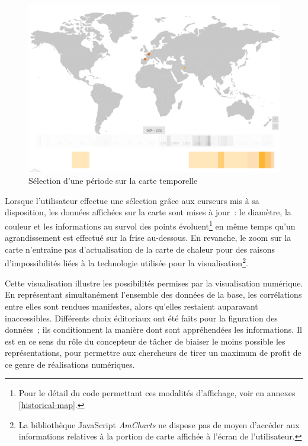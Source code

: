 \documentclass[a4paper,12pt,twoside]{book}
\newcommand{\eng}{\emph}
\begin{document}
\begin{figure}[h!]
	\centering
	\includegraphics[width=16cm]{Images/Visualisations/Historical_navigation-Time_range.png}
	\caption{Sélection d'une période sur la carte temporelle}
\end{figure}

Lorsque l'utilisateur effectue une sélection grâce aux curseurs mis à sa disposition, les données affichées sur la carte sont mises à jour~: le diamètre, la couleur et les informations au survol des points évoluent\footnote{Pour le détail du code permettant ces modalités d'affichage, voir en annexes \ref{historical-map}.} en même temps qu'un agrandissement est effectué sur la frise au-dessous. En revanche, le zoom sur la carte n'entraîne pas d'actualisation de la carte de chaleur pour des raisons d'impossibilités liées à la technologie utilisée pour la visualisation\footnote{La bibliothèque JavaScript \eng{AmCharts} ne dispose pas de moyen d'accéder aux informations relatives à la portion de carte affichée à l'écran de l'utilisateur.}.

Cette visualisation illustre les possibilités permises par la visualisation numérique. En représentant simultanément l'ensemble des données de la base, les corrélations entre elles sont rendues manifestes, alors qu'elles restaient auparavant inaccessibles. Différents choix éditoriaux ont été faits pour la figuration des données~; ils conditionnent la manière dont sont appréhendées les informations. Il est en ce sens du rôle du concepteur de tâcher de biaiser le moins possible les représentations, pour permettre aux chercheurs de tirer un maximum de profit de ce genre de réalisations numériques.\\
\end{document}
